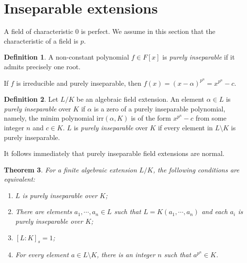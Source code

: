 \documentclass[12pt]{report}
\newtheorem{thm}{Theorem}[section]
\theoremstyle{definition}
\newtheorem{defn}[thm]{Definition}
\def\aa{\alpha}
\def\irr{\text{irr}}
\begin{document}
\section{Inseparable extensions}

A field of characteristic 0 is perfect. We assume in this section that the characteristic of a field is $p$.

\begin{defn}
    A non-constant polynomial $f\in F[x]$ is \emph{purely inseparable} if it admits precisely one root.
\end{defn}

If $f$ is irreducible and purely inseparable, then $f(x)=(x-\aa)^{p^n} = x^{p^n}-c$. 

\begin{defn}
    Let $L/K$ be an algebraic field extension. An element $\aa\in L$ is \emph{purely inseparable} over $K$ if $\aa$ is a zero of a purely inseparable polynomial, namely, the minim polynomial $\irr(\aa,K)$ is of the form $x^{p^n}-c$ from some integer $n$ and $c\in K$. $L$ is \emph{purely inseparable} over $K$ if every element in $L\setminus K$ is purely inseparable.
\end{defn}

It follows immediately that purely inseparable field extensions are normal.

\begin{thm}
    For a finite algebraic extension $L/K$, the following conditions are equivalent: \begin{enumerate}
        \item $L$ is purely inseparable over $K$;
        \item There are elements $a_1,\cdots,a_n\in L$ such that $L=K(a_1,\cdots,a_n)$ and each $a_i$ is purely inseparable over $K$;
        \item $[L:K]_s=1$;
        \item For every element $a\in L\setminus K$, there is an integer $n$ such that $a^{p^n}\in K$.
    \end{enumerate}
\end{thm}
\end{document}
